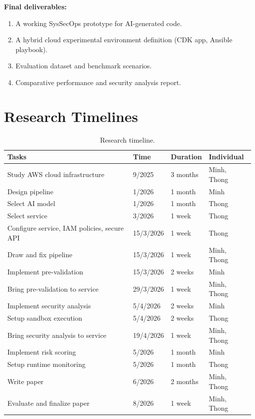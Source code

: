 \textbf{Final deliverables:}
\begin{enumerate}
    \item A working SysSecOps prototype for AI-generated code.
    \item A hybrid cloud experimental environment definition (CDK app, Ansible playbook).
    \item Evaluation dataset and benchmark scenarios.
    \item Comparative performance and security analysis report.
\end{enumerate}

\section*{Research Timelines}

\begin{table}[htb!]
\centering
\caption{Research timeline.}
\label{tab:proposal-timeline}
\begin{tabular}{|L{5.6cm}|C{2.2cm}|C{2.0cm}|C{2.4cm}|}
\hline
\textbf{Tasks} & \textbf{Time} & \textbf{Duration} & \textbf{Individual} \\
\hline
Study AWS cloud infrastructure & 9/2025 & 3 months & Minh, Thong \\
\hline
Design pipeline & 1/2026 & 1 month & Minh \\
\hline
Select AI model & 1/2026 & 1 month & Thong \\
\hline
Select service & 3/2026 & 1 week & Thong \\
\hline
Configure service, IAM policies, secure API & 15/3/2026 & 1 week & Thong \\
\hline
Draw and fix pipeline & 15/3/2026 & 1 week & Minh, Thong \\
\hline
Implement pre-validation & 15/3/2026 & 2 weeks & Minh \\
\hline
Bring pre-validation to service & 29/3/2026 & 1 week & Minh, Thong \\
\hline
Implement security analysis & 5/4/2026 & 2 weeks & Minh \\
\hline
Setup sandbox execution & 5/4/2026 & 2 weeks & Thong \\
\hline
Bring security analysis to service & 19/4/2026 & 1 week & Minh, Thong \\
\hline
Implement risk scoring & 5/2026 & 1 month & Minh \\
\hline
Setup runtime monitoring & 5/2026 & 1 month & Thong \\
\hline
Write paper & 6/2026 & 2 months & Minh, Thong \\
\hline
Evaluate and finalize paper & 8/2026 & 1 week & Minh, Thong \\
\hline
\end{tabular}
\end{table}

